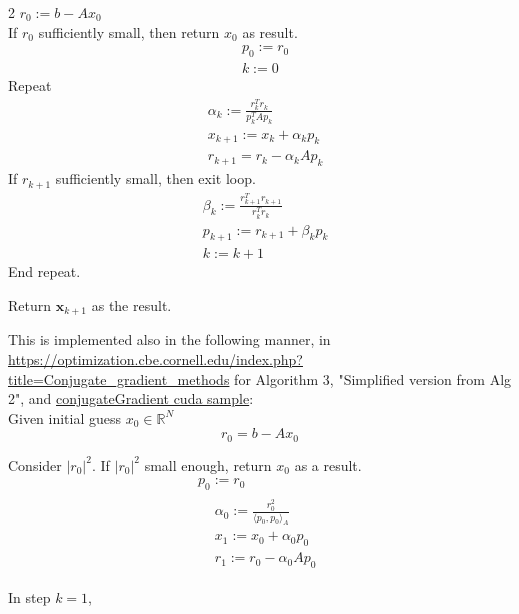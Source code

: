 \documentclass[10pt]{amsart}
\begin{document}
\begin{multicols*}{2}
$r_0 := b- Ax_0$ \\

If $r_0$ sufficiently small, then return $x_0$ as result.
\[
\begin{aligned}
& p_0 := r_0 \\
& k := 0
\end{aligned}
\]
Repeat
\[
\begin{aligned}
& \alpha_k := \frac{r_k^T r_k}{ p_k^T A p_k } \\
& x_{k+1} := x_k + \alpha_k p_k \\
& r_{k+1} = r_k -\alpha_k Ap_k 
\end{aligned}
\]
If $r_{k+1}$ sufficiently small, then exit loop. \\

\[
\begin{aligned}
& \beta_k := \frac{r^T_{k+1} r_{k+1} }{ r_k^T r_k } \\
 & p_{k+1} := r_{k+1} + \beta_k p_k \\
 & k := k + 1
\end{aligned}
\]
End repeat.

Return $\mathbf{x}_{k+1}$ as the result.

This is implemented also in the following manner, in \url{https://optimization.cbe.cornell.edu/index.php?title=Conjugate_gradient_methods} for Algorithm 3, "Simplified version from Alg 2", and \href{https://github.com/NVIDIA/cuda-samples/tree/master/Samples/4_CUDA_Libraries/conjugateGradient}{conjugateGradient cuda sample}: \\

Given initial guess $x_0 \in \mathbb{R}^N$
\[
r_0 = b - Ax_0
\]

Consider $|r_0|^2$. If $|r_0|^2$ small enough, return $x_0$ as a result. \\

\begin{equation}\label{Eq:ConjugateGradientAlgorithmInitialStep}
\begin{gathered}
	p_0 := r_0 \\
	\begin{aligned}
		& \alpha_0 := \frac{r_0^2}{ \langle p_0, p_0 \rangle_A} \\
		& x_1 := x_0 + \alpha_0 p_0 \\
		& r_1 := r_0 - \alpha_0 A p_0
	\end{aligned}
\end{gathered}
\end{equation}

In step $k=1$,


\end{multicols*}
\end{document}

